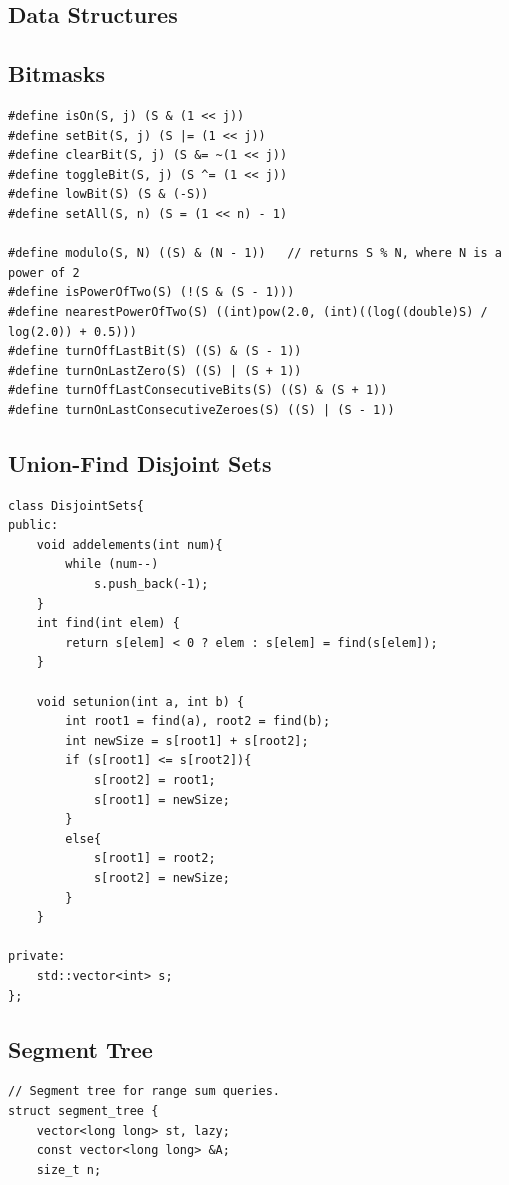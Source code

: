 \documentclass[10pt,landscape]{article}
\begin{document}
\begin{multicols}{2}
\setcounter{page}{1}
\pagestyle{plain}
\tableofcontents
\newpage

\section{Data Structures}
\subsection{Bitmasks}
\begin{lstlisting}
#define isOn(S, j) (S & (1 << j))
#define setBit(S, j) (S |= (1 << j))
#define clearBit(S, j) (S &= ~(1 << j))
#define toggleBit(S, j) (S ^= (1 << j))
#define lowBit(S) (S & (-S))
#define setAll(S, n) (S = (1 << n) - 1)

#define modulo(S, N) ((S) & (N - 1))   // returns S % N, where N is a power of 2
#define isPowerOfTwo(S) (!(S & (S - 1)))
#define nearestPowerOfTwo(S) ((int)pow(2.0, (int)((log((double)S) / log(2.0)) + 0.5)))
#define turnOffLastBit(S) ((S) & (S - 1))
#define turnOnLastZero(S) ((S) | (S + 1))
#define turnOffLastConsecutiveBits(S) ((S) & (S + 1))
#define turnOnLastConsecutiveZeroes(S) ((S) | (S - 1))
\end{lstlisting}

\subsection{Union-Find Disjoint Sets}
\begin{lstlisting}
class DisjointSets{
public:
	void addelements(int num){
		while (num--)
			s.push_back(-1);
	}
	int find(int elem) {
		return s[elem] < 0 ? elem : s[elem] = find(s[elem]); 
	}

	void setunion(int a, int b) {
		int root1 = find(a), root2 = find(b);
		int newSize = s[root1] + s[root2];
		if (s[root1] <= s[root2]){
			s[root2] = root1;
			s[root1] = newSize;
		}
		else{
			s[root1] = root2;
			s[root2] = newSize;
		}
	}

private:
    std::vector<int> s;
};
\end{lstlisting}
\newpage

\subsection{Segment Tree}
\begin{lstlisting}
// Segment tree for range sum queries.
struct segment_tree {
    vector<long long> st, lazy;
    const vector<long long> &A;
    size_t n;


\end{lstlisting}
\end{multicols}
\end{document}
